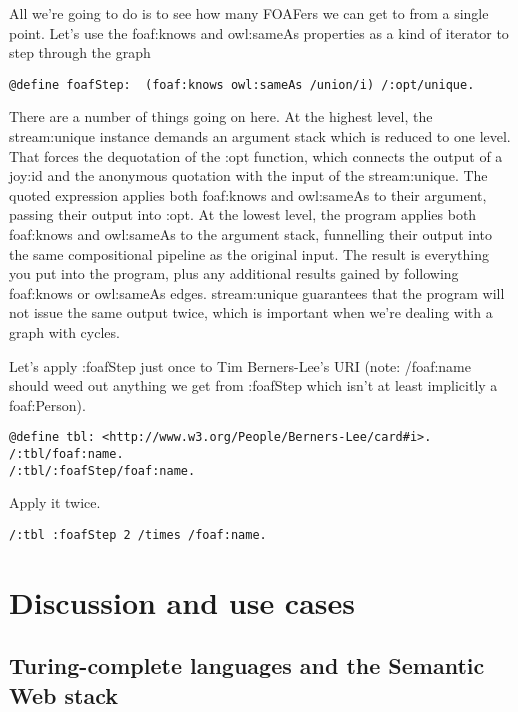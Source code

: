 \documentclass[runningheads]{llncs}
\begin{document}
All we're going to do is to see how many FOAFers we can get to from a single point.  Let's use the foaf:knows and owl:sameAs properties as a kind of iterator to step through the graph

\begin{verbatim}
@define foafStep:  (foaf:knows owl:sameAs /union/i) /:opt/unique.
\end{verbatim}

There are a number of things going on here.  At the highest level, the stream:unique instance demands an argument stack which is reduced to one level.  That forces the dequotation of the :opt function, which connects
the output of a joy:id and the anonymous quotation with the input of the stream:unique.  The quoted expression applies both foaf:knows and owl:sameAs to their argument, passing their output into :opt.  At the lowest level, the program
applies both foaf:knows and owl:sameAs to the argument stack, funnelling their output into the same compositional
pipeline as the original input.  The result is everything you put into the program, plus any additional results gained by following foaf:knows or owl:sameAs edges.  stream:unique guarantees that the program will not issue the same output twice, which is important when we're dealing with a graph with cycles.

Let's apply :foafStep just once to Tim Berners-Lee's URI (note: /foaf:name should weed out anything we get from :foafStep which isn't at least implicitly a foaf:Person).

\begin{verbatim}
@define tbl: <http://www.w3.org/People/Berners-Lee/card#i>.
/:tbl/foaf:name.
/:tbl/:foafStep/foaf:name.
\end{verbatim}

Apply it twice.

\begin{verbatim}
/:tbl :foafStep 2 /times /foaf:name.
\end{verbatim}




\section{Discussion and use cases}

\subsection{Turing-complete languages and the Semantic Web stack}
\end{document}
